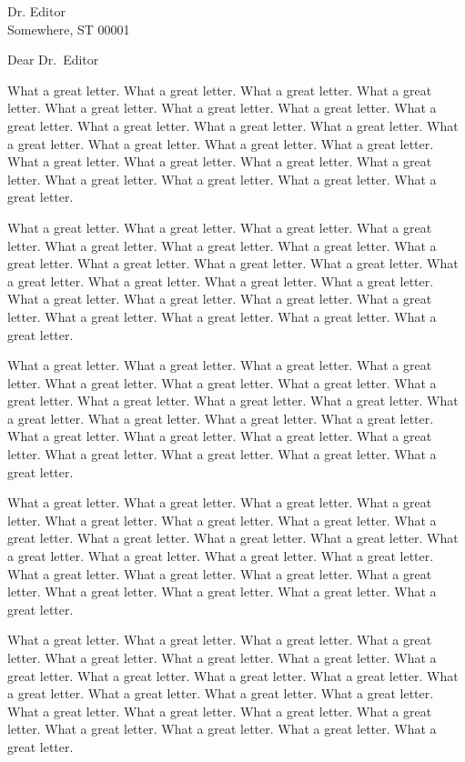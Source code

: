 \documentclass[ucd,esp,shortfrom,11pt]{ucletter}
\begin{document}
\begin{letter}{
    Dr. Editor \\
    Somewhere, ST 00001
}
\opening{Dear Dr.\ Editor}

What a great letter. What a great letter. What a great letter. What a great
letter. What a great letter. What a great letter. What a great letter. What a
great letter. What a great letter. What a great letter. What a great letter.
What a great letter. What a great letter. What a great letter. What a great
letter. What a great letter. What a great letter. What a great letter. What a
great letter. What a great letter. What a great letter. What a great letter.
What a great letter.

What a great letter. What a great letter. What a great letter. What a great
letter. What a great letter. What a great letter. What a great letter. What a
great letter. What a great letter. What a great letter. What a great letter.
What a great letter. What a great letter. What a great letter. What a great
letter. What a great letter. What a great letter. What a great letter. What a
great letter. What a great letter. What a great letter. What a great letter.
What a great letter.

What a great letter. What a great letter. What a great letter. What a great
letter. What a great letter. What a great letter. What a great letter. What a
great letter. What a great letter. What a great letter. What a great letter.
What a great letter. What a great letter. What a great letter. What a great
letter. What a great letter. What a great letter. What a great letter. What a
great letter. What a great letter. What a great letter. What a great letter.
What a great letter.

What a great letter. What a great letter. What a great letter. What a great
letter. What a great letter. What a great letter. What a great letter. What a
great letter. What a great letter. What a great letter. What a great letter.
What a great letter. What a great letter. What a great letter. What a great
letter. What a great letter. What a great letter. What a great letter. What a
great letter. What a great letter. What a great letter. What a great letter.
What a great letter.

What a great letter. What a great letter. What a great letter. What a great
letter. What a great letter. What a great letter. What a great letter. What a
great letter. What a great letter. What a great letter. What a great letter.
What a great letter. What a great letter. What a great letter. What a great
letter. What a great letter. What a great letter. What a great letter. What a
great letter. What a great letter. What a great letter. What a great letter.
What a great letter.


\end{letter}
\end{document}
